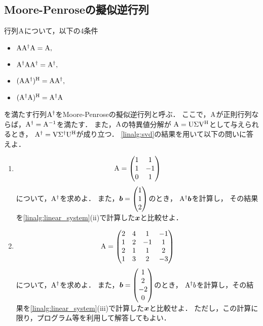 \subsection{Moore-Penroseの擬似逆行列}
  行列$\mathrm{A}$について，以下の4条件
  \begin{itemize}
    \item $\mathrm{A}\mathrm{A}^\dagger\mathrm{A}=\mathrm{A},$
    \item $\mathrm{A}^\dagger\mathrm{A}\mathrm{A}^\dagger=\mathrm{A}^\dagger,$
    \item $(\mathrm{A}\mathrm{A}^\dagger)^\mathrm{H}=\mathrm{A}\mathrm{A}^\dagger,$
    \item $(\mathrm{A}^\dagger\mathrm{A})^\mathrm{H}=\mathrm{A}^\dagger\mathrm{A}$
  \end{itemize}
  を満たす行列$\mathrm{A}^\dagger$をMoore-Penroseの擬似逆行列と呼ぶ．
  ここで，$\mathrm{A}$が正則行列ならば，$\mathrm{A}^\dagger=\mathrm{A}^{-1}$を満たす．
  また，$\mathrm{A}$の特異値分解が
  $\mathrm{A}=\mathrm{U}\mathrm{\Sigma}\mathrm{V}^\mathrm{H}$として与えられるとき，
  $\mathrm{A}^\dagger=\mathrm{V}\mathrm{\Sigma}^\dagger\mathrm{U}^\mathrm{H}$が成り立つ．
  \ref{linalg:svd}の結果を用いて以下の問いに答えよ．
  \begin{enumerate}[label=(\roman*)]
    \item
      \begin{equation}
        \mathrm{A} =
          \begin{pmatrix}
            1 & 1 \\
            1 & -1 \\
            0 & 1
          \end{pmatrix}
      \end{equation}
      について，$\mathrm{A}^\dagger$を求めよ．
      また，$\boldsymbol{b} = \begin{pmatrix} 1 \\ 1 \\ 2 \end{pmatrix}$のとき，
      $\mathrm{A}^\dagger \boldsymbol{b}$を計算し，
      その結果を\ref{linalg:linear_system}(ii)で計算した$\boldsymbol{x}$と比較せよ．
  
    \item
      \begin{equation}
        \mathrm{A} =
          \begin{pmatrix}
            2 & 4 & 1 & -1 \\
            1 & 2 & -1 & 1 \\
            2 & 1 & 1 & 2 \\
            1 & 3 & 2 & -3
          \end{pmatrix}
      \end{equation}
      について，$\mathrm{A}^\dagger$を求めよ．
      また，$\boldsymbol{b}=\begin{pmatrix} 1 \\ 2 \\ -2 \\ 0 \end{pmatrix}$のとき，
      $\mathrm{A}^\dagger b$を計算し，その結果を\ref{linalg:linear_system}(iii)で計算した$\boldsymbol{x}$と比較せよ．
      ただし，この計算に限り，プログラム等を利用して解答してもよい．
  \end{enumerate}

